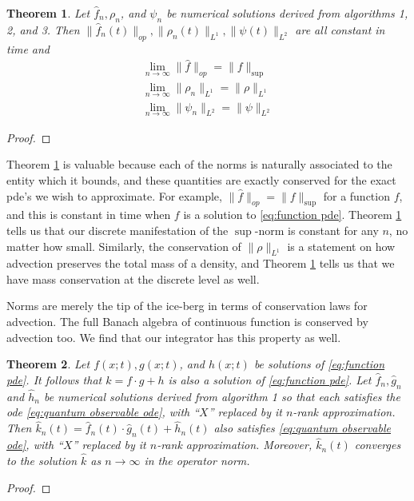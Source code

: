\documentclass[12pt]{amsart}
\newtheorem{thm}{Theorem}[section]
\begin{document}
\begin{thm} \label{thm:norms}
	Let $\hat{f}_{n}, \rho_{n}$, and $\psi_{n}$ be numerical solutions derived from algorithms 1, 2, and 3.
	Then $\| \hat{f}_{n}(t) \|_{op}, \|\rho_{n}(t)\|_{L^{1}} , \| \psi (t)\|_{L^{2}}$ are all constant in time
	and
	\begin{align*}
		\lim_{n \to \infty} \| \hat{f} \|_{op} = \| f \|_{\sup} \\
		\lim_{n \to \infty} \| \rho_{n} \|_{L^{1}} = \| \rho \|_{L^{1}} \\
		\lim_{n \to \infty} \| \psi_{n} \|_{L^{2}} = \| \psi \|_{L^{2}}
	\end{align*}
\end{thm}
\begin{proof}
\end{proof}

Theorem \ref{thm:norms} is valuable because each of the norms is naturally associated to the entity which it bounds, and these quantities are exactly conserved for the exact pde's we wish to approximate.
For example, $\| \hat{f} \|_{op} = \| f \|_{\sup}$ for a function $f$, and this is constant in time when $f$ is a solution to \eqref{eq:function pde}.
Theorem \ref{thm:norms} tells us that our discrete manifestation of the $\sup$-norm is constant for any $n$, no matter how small.
Similarly, the conservation of $\| \rho \|_{L^{1}}$ is a statement on how advection preserves the total mass of a density, and Theorem \ref{thm:norms} tells us that we have mass conservation at the discrete level as well.

Norms are merely the tip of the ice-berg in terms of conservation laws for advection.
The full Banach algebra of continuous function is conserved by advection too.
We find that our integrator has this property as well.
\begin{thm} \label{thm:algebra}
	Let $f(x;t),g(x;t)$, and $h(x;t)$ be solutions of \eqref{eq:function pde}.
	It follows that $k= f \cdot g + h $ is also a solution of \eqref{eq:function pde}.
	Let $\hat{f}_{n}, \hat{g}_{n}$ and $\hat{h}_{n}$ be numerical solutions derived from algorithm 1
	so that each satisfies the ode \eqref{eq:quantum observable ode}, with ``$X$'' replaced by it $n$-rank approximation.
	Then $\hat{k}_{n}(t) = \hat{f}_{n}(t) \cdot \hat{g}_{n}(t) + \hat{h}_{n}(t)$ also satisfies \eqref{eq:quantum observable ode}, with ``$X$'' replaced by it $n$-rank approximation.
	Moreover, $\hat{k}_{n}(t)$ converges to the solution $\hat{k}$ as $n \to \infty$ in the operator norm.
\end{thm}
\begin{proof}
\end{proof}
\end{document}
